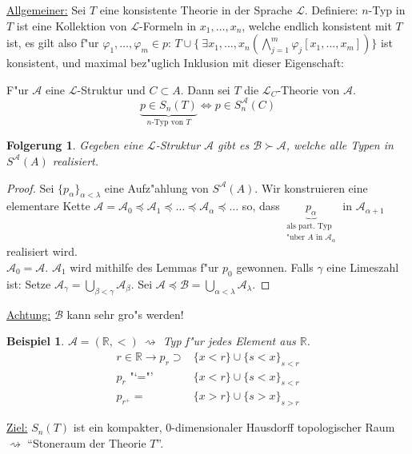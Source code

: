 \documentclass[a4paper,12pt,numbers=noenddot,parskip=full]{scrartcl}
\newcommand{\setR}{\mathbb{R}}
\newcommand{\Exists}{~\exists}
\newcommand{\scrL}{\mathcal{L}}
\newcommand{\scrA}{\mathcal{A}}
\newcommand{\scrB}{\mathcal{B}}
\newcommand{\heading}{\underline}
\theoremstyle{dotless}
\newtheorem{corollary}[theorem]{Folgerung}
\newtheorem{example}[theorem]{Beispiel}
\theoremstyle{remark}
\begin{document}
\heading{Allgemeiner:} Sei $T$ eine konsistente Theorie in der Sprache $\scrL$. Definiere: $n$-Typ in $T$ ist eine Kollektion von $\scrL$-Formeln in $x_1, \dots, x_n$, welche endlich konsistent mit $T$ ist, es gilt also f"ur $\varphi_1, \dots, \varphi_m \in p$: $T \cup \{\Exists x_1, \dots, x_n (\bigwedge\limits_{j=1}^m \varphi_j [x_1, \dots, x_m]) \}$ ist konsistent, und maximal bez"uglich Inklusion mit dieser Eigenschaft:

F"ur $\scrA$ eine $\scrL$-Struktur und $C \subset A$. Dann sei $T$ die $\scrL_C$-Theorie von $\scrA$. \begin{equation*}
	\underbrace{p \in S_n (T)}_{n \text{-Typ von }T} \Leftrightarrow p \in S_n^\scrA (C)
\end{equation*}

\begin{corollary}
	Gegeben eine $\scrL$-Struktur $\scrA$ gibt es $\scrB \succ \scrA$, welche alle Typen in $S^\scrA (A)$ realisiert.
\end{corollary}
\begin{proof}
	Sei $\{p_\alpha\}_{\alpha < \lambda}$ eine Aufz"ahlung von $S^\scrA (A)$. Wir konstruieren eine elementare Kette $\scrA = \scrA_0 \preceq \scrA_1 \preceq \dots \preceq \scrA_\alpha \preceq \dots$ so, dass $\underbrace{p_\alpha}_{\substack{\text{als part. Typ}\\ \text{"uber } A \text{ in } \scrA_\alpha}}$ in $\scrA_{\alpha+1}$ realisiert wird.\\
	$\scrA_0 = \scrA$. $\scrA_1$ wird mithilfe des Lemmas f"ur $p_0$ gewonnen. Falls $\gamma$ eine Limeszahl ist: Setze $\scrA_\gamma = \bigcup\limits_{\beta<\gamma} \scrA_\beta$. Sei $\scrA \preceq \scrB = \bigcup\limits_{\alpha<\lambda} \scrA_\lambda$.
\end{proof}

\heading{Achtung:} $\scrB$ kann sehr gro"s werden!
\begin{example}
	$\scrA = (\setR, <) ~\rightsquigarrow$ Typ f"ur jedes Element aus $\setR$.
	\begin{align*}
		r \in \setR \longrightarrow p_r \supset &\{x<r \} \cup \{s < x \}_{s<r}\\
		p_r \text{ "`="' } &\{x<r \} \cup \{s < x \}_{s<r}\\
		p_{r^+} = &\{x> r\} \cup \{s>x \}_{s>r}
	\end{align*}
\end{example}

\heading{Ziel:} $S_n (T)$ ist ein kompakter, $0$-dimensionaler Hausdorff topologischer Raum $\rightsquigarrow$ "`Stoneraum der Theorie $T$"'.
\end{document}
